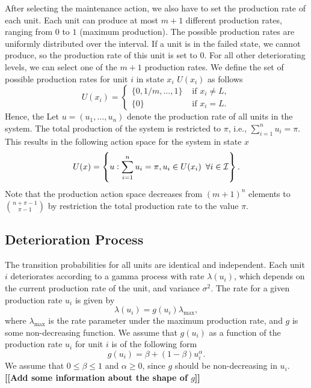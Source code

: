 \documentclass[a4paper,12pt]{article}
\begin{document}
After selecting the maintenance action, we also have to set the production rate of each unit. Each unit can produce at most $m+1$ different production rates, ranging from $0$ to $1$ (maximum production). The possible production rates are uniformly distributed over the interval. If a unit is in the failed state, we cannot produce, so the production rate of this unit is set to $0$. For all other deteriorating levels, we can select one of the $m+1$ production rates. We define the set of possible production rates for unit $i$ in state $x_i$ $U(x_i)$ as follows
$$
U(x_i) = \begin{cases}
\{0, 1/m, \dots, 1\} & \text{ if } x_i \neq L, \\
\{0\} & \text{ if } x_i = L.
\end{cases}
$$
Hence, the 
Let $u = (u_1, \dots, u_n)$ denote the production rate of all units in the system. The total production of the system is restricted to $\pi$, i.e., $ \sum_{i=1}^{n}u_i = \pi$. This results in the following action space for the system in state $x$
$$
U(x) = \left\{ u  :  \sum_{i=1}^{n}u_i = \pi, u_i \in U(x_i) \enskip \forall i \in \mathcal{I} \right\}.
$$
Note that the production action space decreases from $(m+1)^n$ elements to ${n + \pi - 1} \choose{\pi - 1} $ by restriction the total production rate to the value $\pi$. 

\subsection{Deterioration Process}
The transition probabilities for all units are identical and independent. Each unit $i$ deteriorates according to a gamma process with rate $\lambda(u_i)$, which depends on the current production rate of the unit, and variance $\sigma^2$. The rate for a given production rate $u_i$ is given by
$$
\lambda(u_i) = g(u_i) \lambda_{\text{max}},
$$
where $\lambda_{\text{max}}$ is the rate parameter under the maximum production rate, and $g$ is some non-decreasing function. We assume that $g(u_i)$ as a function of the production rate $u_i$ for unit $i$ is of the following form
$$
g(u_i) = \beta + (1-\beta)u_i^\alpha.
$$
We assume that $0 \leq \beta \leq 1$ and $\alpha \geq 0$, since $g$ should be non-decreasing in $u_i$. \textbf{[[Add some information about the shape of $g$]]}
\end{document}
